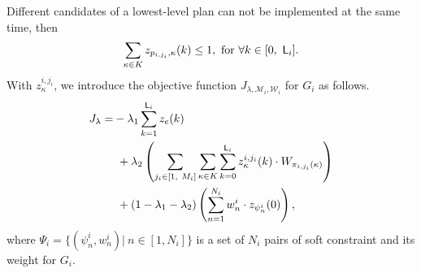 \documentclass[journal,twoside,web]{IEEEtran}
\newcommand{\Len}{{\sf L}}
\newcommand{\M}{\mathcal{M}}
\newcommand{\W}{\mathcal{W}}
\begin{document}
%
%
Different candidates of a lowest-level plan can not be implemented at the same time, then
\begin{align}\label{hier3}
\sum_{\kappa\in K}{z}_{p_{i,{j_i}},\kappa}(k) \leq 1,~\mbox{for }\forall k\in[0,~\Len_i].
\end{align}
%
With ${z}^{i,{j_i}}_\kappa$, we introduce the objective function $J_{\lambda,\M_i,\W_i}$ for $G_i$ as follows.
\begin{align}
J_{\lambda}=&
-\lambda_1\sum_{k=1}^{\Len_i}z_e(k) 
\notag\\&~
+
{\lambda_2}\left(\sum_{j_i\in[1,~M_i]} \sum_{\kappa\in K} \sum_{k=0}^{\Len_i} {z}^{i,{j_i}}_\kappa(k) \cdot {W_{\pi_{i,{j_i}}(\kappa)}}\right)
\notag\\&~
+
(1-{\lambda_1}-{\lambda_2})\left(\sum_{n=1}^{N_i} w^i_{n}\cdot z_{\psi^i_{n}}(0)\right) ,\notag
\end{align}
where $\Psi_i=\{(\psi^i_n,w_n^i)|~n\in[1,N_i]\}$ is a set of $N_i$ pairs of soft constraint and its weight for $G_i$.
%
%
%
\end{document}
